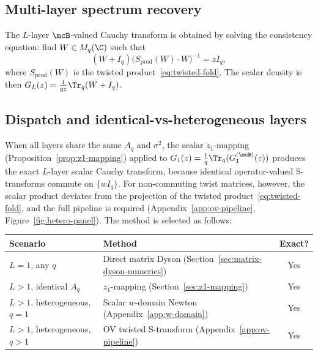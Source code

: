 \subsection{Multi-layer spectrum recovery}\label{sec:ov-multilayer}

The $L$-layer $\mcB$-valued Cauchy transform is obtained by solving the consistency equation: find $W \in M_q(\C)$ such that
\begin{equation}\label{eq:outer-consistency}
(W + I_q)\bigl(S_{\mathrm{prod}}(W) \cdot W\bigr)^{-1} = z I_q,
\end{equation}
where $S_{\mathrm{prod}}(W)$ is the twisted product~\eqref{eq:twisted-fold}. The scalar density is then $G_L(z) = \frac{1}{qz}\Tr_q(W + I_q)$.

\subsection{Dispatch and identical-vs-heterogeneous layers}\label{sec:identical-vs-hetero}

When all layers share the same $A_q$ and $\sigma^2$, the scalar $z_1$-mapping (Proposition~\ref{prop:z1-mapping}) applied to $G_1(z) = \frac{1}{q}\Tr_q(G^{(\mcB)}_1(z))$ produces the exact $L$-layer scalar Cauchy transform, because identical operator-valued S-transforms commute on $\{wI_q\}$. For non-commuting twist matrices, however, the scalar product deviates from the projection of the twisted product~\eqref{eq:twisted-fold}, and the full pipeline is required (Appendix~\ref{app:ov-pipeline}, Figure~\ref{fig:hetero-panel}). The method is selected as follows:

\begin{center}
\begin{tabular}{llc}
\hline
\textbf{Scenario} & \textbf{Method} & \textbf{Exact?} \\
\hline
$L = 1$, any $q$ & Direct matrix Dyson (Section~\ref{sec:matrix-dyson-numerics}) & Yes \\
$L > 1$, identical $A_q$ & $z_1$-mapping (Section~\ref{sec:z1-mapping}) & Yes \\
$L > 1$, heterogeneous, $q = 1$ & Scalar $w$-domain Newton (Appendix~\ref{app:w-domain}) & Yes \\
$L > 1$, heterogeneous, $q > 1$ & OV twisted S-transform (Appendix~\ref{app:ov-pipeline}) & Yes \\
\hline
\end{tabular}
\end{center}
